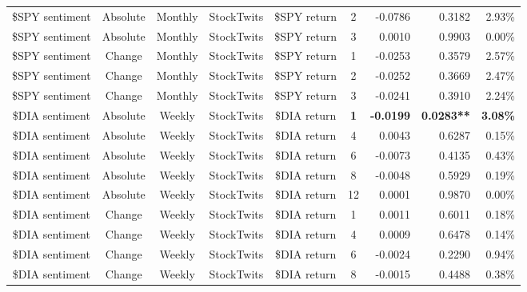 \begin{longtable}{ccccccrrrrr}
    \$SPY sentiment & Absolute & Monthly & StockTwits & \$SPY return & 2     & -0.0786 & \multicolumn{2}{r}{0.3182} & \multicolumn{2}{r}{2.93\%} \\
    \$SPY sentiment & Absolute & Monthly & StockTwits & \$SPY return & 3     & 0.0010 & \multicolumn{2}{r}{0.9903} & \multicolumn{2}{r}{0.00\%} \\
    \$SPY sentiment & Change & Monthly & StockTwits & \$SPY return & 1     & -0.0253 & \multicolumn{2}{r}{0.3579} & \multicolumn{2}{r}{2.57\%} \\
    \$SPY sentiment & Change & Monthly & StockTwits & \$SPY return & 2     & -0.0252 & \multicolumn{2}{r}{0.3669} & \multicolumn{2}{r}{2.47\%} \\
    \$SPY sentiment & Change & Monthly & StockTwits & \$SPY return & 3     & -0.0241 & \multicolumn{2}{r}{0.3910} & \multicolumn{2}{r}{2.24\%} \\
    \$DIA sentiment & Absolute & Weekly & StockTwits & \$DIA return & \textbf{1} & \textbf{-0.0199} & \multicolumn{2}{r}{\textbf{0.0283**}} & \multicolumn{2}{r}{\textbf{3.08\%}} \\
    \$DIA sentiment & Absolute & Weekly & StockTwits & \$DIA return & 4     & 0.0043 & \multicolumn{2}{r}{0.6287} & \multicolumn{2}{r}{0.15\%} \\
    \$DIA sentiment & Absolute & Weekly & StockTwits & \$DIA return & 6     & -0.0073 & \multicolumn{2}{r}{0.4135} & \multicolumn{2}{r}{0.43\%} \\
    \$DIA sentiment & Absolute & Weekly & StockTwits & \$DIA return & 8     & -0.0048 & \multicolumn{2}{r}{0.5929} & \multicolumn{2}{r}{0.19\%} \\
    \$DIA sentiment & Absolute & Weekly & StockTwits & \$DIA return & 12    & 0.0001 & \multicolumn{2}{r}{0.9870} & \multicolumn{2}{r}{0.00\%} \\
    \$DIA sentiment & Change & Weekly & StockTwits & \$DIA return & 1     & 0.0011 & \multicolumn{2}{r}{0.6011} & \multicolumn{2}{r}{0.18\%} \\
    \$DIA sentiment & Change & Weekly & StockTwits & \$DIA return & 4     & 0.0009 & \multicolumn{2}{r}{0.6478} & \multicolumn{2}{r}{0.14\%} \\
    \$DIA sentiment & Change & Weekly & StockTwits & \$DIA return & 6     & -0.0024 & \multicolumn{2}{r}{0.2290} & \multicolumn{2}{r}{0.94\%} \\
    \$DIA sentiment & Change & Weekly & StockTwits & \$DIA return & 8     & -0.0015 & \multicolumn{2}{r}{0.4488} & \multicolumn{2}{r}{0.38\%} \\

\end{longtable}
